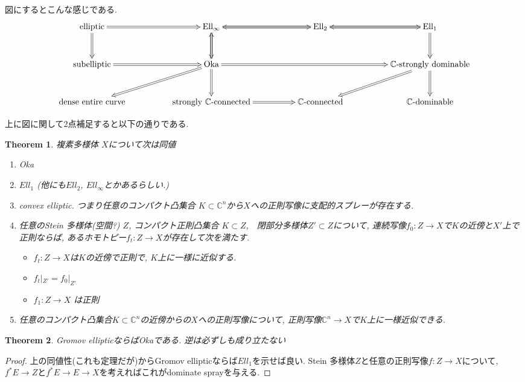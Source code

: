 \documentclass[dvipdfmx,a4paper,11pt]{article} %
\newtheorem{thm}{Theorem}[section]
\theoremstyle{definition}
\theoremstyle{remark}
\numberwithin{equation}{section}
\newcommand{\C}{\mathbb{C}}
\begin{document}
図にするとこんな感じである. 
\[
\xymatrix@C=50pt@R=30pt{
  \hbox{elliptic} \ar@{=>}[d]\ar@{=>}[r] & \hbox{Ell}_\infty \ar@{=>}[d] \ar@{=>}[r] & \hbox{Ell}_2 \ar@{=>}[r] \ar@{=>}[l]& \hbox{Ell}_1 \ar@{=>}[l] \ar@{=>}[d]\\
\hbox{subelliptic} \ar@{=>}[r] & \hbox{Oka} \ar@{=>}[ld]\ar@{=>}[rr] \ar@{=>}[d]  \ar@{=>}[u]& &\hbox{$\C$-strongly dominable}  \ar@{=>}[d] \ar@{=>}[ld]\\
  \hbox{dense entire curve} & \hbox{strongly $\C$-connected} \ar@{=>}[r] & \hbox{$\C$-connected}& \hbox{$\C$-dominable} 
}
\]

上に図に関して2点補足すると以下の通りである.

\begin{thm}\cite{Kus21}\cite{For13}
複素多様体 $X$について次は同値
\begin{enumerate}
  \setlength{\parskip}{0cm} %
  \setlength{\itemsep}{0cm} %
  \item Oka
 \item $Ell_1$ (他にも$Ell_2$, $Ell_{\infty}$とかあるらしい.)
 \item convex elliptic. つまり任意のコンパクト凸集合 $K \subset \C^n$から$X$への正則写像に支配的スプレーが存在する.
 \item 任意のStein 多様体(空間?) $Z$, コンパクト正則凸集合 $K \subset Z$,　閉部分多様体$Z' \subset Z$について, 連続写像$f_0 : Z \to X$で$K$の近傍と$X'$上で正則ならば, あるホモトピー$f_t : Z \to X$が存在して次を満たす. 
 \begin{itemize}
  \setlength{\parskip}{0cm} %
  \setlength{\itemsep}{0cm} 
  \item $f_t : Z \to X$は$K$の近傍で正則で, $K$上に一様に近似する.
  \item $f_t|_{Z'} = f_{0}|_{Z'}$
  \item $f_1 :  Z \to X$ は正則
 \end{itemize}
 \item 任意のコンパクト凸集合$K \subset \C^n$の近傍からの$X$への正則写像について, 正則写像$\C^n \to X$で$K$上に一様近似できる. 
 \end{enumerate}
\end{thm}


\begin{thm}
Gromov ellipticならばOkaである. 逆は必ずしも成り立たない
\end{thm}
\begin{proof}
上の同値性(これも定理だが)からGromov ellipticならば$Ell_1$を示せば良い.
Stein 多様体$Z$と任意の正則写像$f :  Z \to X$について, $f^{*} E \to Z$と$f^{*} E  \to E \to X$を考えればこれがdominate sprayを与える. 
\end{proof}
\end{document}
